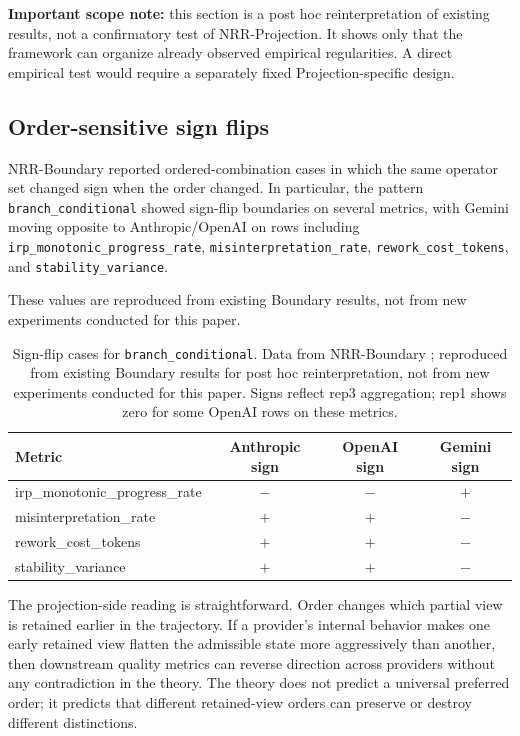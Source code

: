\documentclass[11pt,a4paper]{article}
\begin{document}
\textbf{Important scope note:} this section is a post hoc reinterpretation of existing results, not a confirmatory test of NRR-Projection. It shows only that the framework can organize already observed empirical regularities. A direct empirical test would require a separately fixed Projection-specific design.

\subsection{Order-sensitive sign flips}

NRR-Boundary \cite{saito2026boundary} reported ordered-combination cases in which the same operator set changed sign when the order changed. In particular, the pattern \texttt{branch\_conditional} showed sign-flip boundaries on several metrics, with Gemini moving opposite to Anthropic/OpenAI on rows including \texttt{irp\_monotonic\_progress\_rate}, \texttt{misinterpretation\_rate}, \texttt{rework\_cost\_tokens}, and \texttt{stability\_variance}.

These values are reproduced from existing Boundary results, not from new experiments conducted for this paper.

\begin{table}[h]
\centering
\small
\begin{tabular}{p{5.2cm}ccc}
\toprule
Metric & Anthropic sign & OpenAI sign & Gemini sign \\
\midrule
irp\_monotonic\_progress\_rate & $-$ & $-$ & $+$ \\
misinterpretation\_rate & $+$ & $+$ & $-$ \\
rework\_cost\_tokens & $+$ & $+$ & $-$ \\
stability\_variance & $+$ & $+$ & $-$ \\
\bottomrule
\end{tabular}
\caption{Sign-flip cases for \texttt{branch\_conditional}. Data from NRR-Boundary \cite{saito2026boundary}; reproduced from existing Boundary results for post hoc reinterpretation, not from new experiments conducted for this paper. Signs reflect rep3 aggregation; rep1 shows zero for some OpenAI rows on these metrics.}
\label{tab:boundary_signflip}
\end{table}

The projection-side reading is straightforward. Order changes which partial view is retained earlier in the trajectory. If a provider's internal behavior makes one early retained view flatten the admissible state more aggressively than another, then downstream quality metrics can reverse direction across providers without any contradiction in the theory. The theory does not predict a universal preferred order; it predicts that different retained-view orders can preserve or destroy different distinctions.
\end{document}
